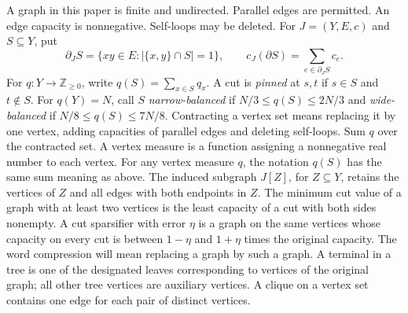 \documentclass[11pt]{article}
\theoremstyle{definition}
\newcommand{\cut}{\partial}
\begin{document}
A graph in this paper is finite and undirected. Parallel edges are permitted.
An edge capacity is nonnegative. Self-loops may be deleted. For
$J=(Y,E,c)$ and $S\subseteq Y$, put
\[
 \cut_J S=\{xy\in E:|\{x,y\}\cap S|=1\},\qquad
 c_J(\cut S)=\sum_{e\in\cut_J S}c_e.
\]
For $q:Y\to\mathbb Z_{\ge0}$, write $q(S)=\sum_{x\in S}q_x$.
A cut is \emph{pinned} at $s,t$ if $s\in S$ and $t\notin S$. For $q(Y)=N$, call $S$ \emph{narrow-balanced} if $N/3\le q(S)\le2N/3$ and \emph{wide-balanced} if $N/8\le q(S)\le7N/8$.
Contracting a vertex set means replacing it by one vertex, adding capacities
of parallel edges and deleting self-loops. Sum $q$ over the contracted set.
A vertex measure is a function assigning a nonnegative real number to each
vertex. For any vertex measure $q$, the notation $q(S)$ has the same
sum meaning as above. The induced subgraph $J[Z]$, for $Z\subseteq Y$,
retains the vertices of $Z$ and all edges with both endpoints in $Z$.
The minimum cut value of a graph with at least two vertices is the least
capacity of a cut with both sides nonempty. A cut sparsifier with error
$\eta$ is a graph on the same vertices whose capacity on every cut is
between $1-\eta$ and $1+\eta$ times the original capacity. The word
compression will mean replacing a graph by such a graph. A terminal in a
tree is one of the designated leaves corresponding to vertices of the
original graph; all other tree vertices are auxiliary vertices. A clique
on a vertex set contains one edge for each pair of distinct vertices.
\end{document}
